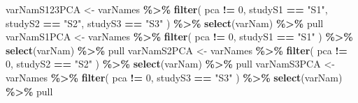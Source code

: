 \documentclass[
]{article}
\newenvironment{Shaded}{\begin{snugshade}}{\end{snugshade}}
\newcommand{\DecValTok}[1]{\textcolor[rgb]{0.00,0.00,0.81}{#1}}
\newcommand{\FunctionTok}[1]{\textcolor[rgb]{0.13,0.29,0.53}{\textbf{#1}}}
\newcommand{\NormalTok}[1]{#1}
\newcommand{\OtherTok}[1]{\textcolor[rgb]{0.56,0.35,0.01}{#1}}
\newcommand{\SpecialCharTok}[1]{\textcolor[rgb]{0.81,0.36,0.00}{\textbf{#1}}}
\newcommand{\StringTok}[1]{\textcolor[rgb]{0.31,0.60,0.02}{#1}}
\begin{document}
\begin{Shaded}
\begin{Highlighting}[]
\NormalTok{varNamS123PCA }\OtherTok{\textless{}{-}}\NormalTok{ varNames }\SpecialCharTok{\%\textgreater{}\%}
  \FunctionTok{filter}\NormalTok{(}
\NormalTok{    pca }\SpecialCharTok{!=} \DecValTok{0}\NormalTok{,}
\NormalTok{    studyS1 }\SpecialCharTok{==} \StringTok{"S1"}\NormalTok{,}
\NormalTok{    studyS2 }\SpecialCharTok{==} \StringTok{"S2"}\NormalTok{,}
\NormalTok{    studyS3 }\SpecialCharTok{==} \StringTok{"S3"}
\NormalTok{  ) }\SpecialCharTok{\%\textgreater{}\%}
  \FunctionTok{select}\NormalTok{(varNam) }\SpecialCharTok{\%\textgreater{}\%}
\NormalTok{  pull}
\NormalTok{varNamS1PCA }\OtherTok{\textless{}{-}}\NormalTok{ varNames }\SpecialCharTok{\%\textgreater{}\%}
  \FunctionTok{filter}\NormalTok{(}
\NormalTok{    pca }\SpecialCharTok{!=} \DecValTok{0}\NormalTok{,}
\NormalTok{    studyS1 }\SpecialCharTok{==} \StringTok{"S1"}
\NormalTok{  ) }\SpecialCharTok{\%\textgreater{}\%}
  \FunctionTok{select}\NormalTok{(varNam) }\SpecialCharTok{\%\textgreater{}\%}
\NormalTok{  pull}
\NormalTok{varNamS2PCA }\OtherTok{\textless{}{-}}\NormalTok{ varNames }\SpecialCharTok{\%\textgreater{}\%}
  \FunctionTok{filter}\NormalTok{(}
\NormalTok{    pca }\SpecialCharTok{!=} \DecValTok{0}\NormalTok{,}
\NormalTok{    studyS2 }\SpecialCharTok{==} \StringTok{"S2"}
\NormalTok{  ) }\SpecialCharTok{\%\textgreater{}\%}
  \FunctionTok{select}\NormalTok{(varNam) }\SpecialCharTok{\%\textgreater{}\%} 
\NormalTok{  pull}
\NormalTok{varNamS3PCA }\OtherTok{\textless{}{-}}\NormalTok{ varNames }\SpecialCharTok{\%\textgreater{}\%}
  \FunctionTok{filter}\NormalTok{(}
\NormalTok{    pca }\SpecialCharTok{!=} \DecValTok{0}\NormalTok{,}
\NormalTok{    studyS3 }\SpecialCharTok{==} \StringTok{"S3"}
\NormalTok{  ) }\SpecialCharTok{\%\textgreater{}\%}
  \FunctionTok{select}\NormalTok{(varNam) }\SpecialCharTok{\%\textgreater{}\%}
\NormalTok{  pull}


\end{Highlighting}
\end{Shaded}
\end{document}
